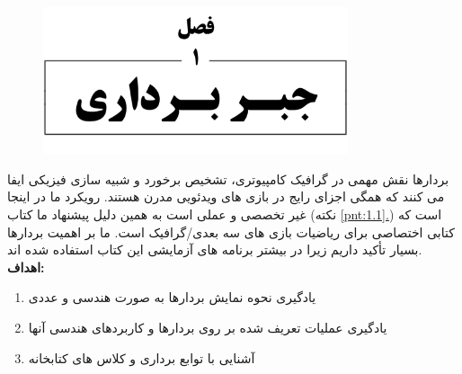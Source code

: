 \chapter{}
\textbf{\vspace{-140pt}}
\begin{figure}[H]
    \centering
    \setlength{\belowcaptionskip}{-10pt}
    \includegraphics[width=0.8\textwidth]{Images/4/1/4.Session.1.1.0}
    \label{fig:4.Session.1.2.0}
\end{figure}
\textbf{\vspace{20pt}}
{
    \Large
    \begin{spacing}{1.5}
        بردارها نقش مهمی در گرافیک کامپیوتری، تشخیص برخورد و شبیه سازی فیزیکی ایفا می کنند که همگی اجزای رایج در بازی های ویدئویی مدرن هستند.
        رویکرد ما در اینجا غیر تخصصی و عملی است به همین دلیل پیشنهاد ما کتاب  (نکته \hyperref[pnt:1.1]{\ref{pnt:1.1}.}) است که کتابی اختصاصی برای ریاضیات بازی های سه بعدی/گرافیک است.
        ما بر اهمیت بردارها بسیار تأکید داریم زیرا در بیشتر برنامه های آزمایشی این کتاب استفاده شده اند.
        \\

        \textbf{\LARGE \hspace{-40pt}اهداف:}
        \begin{enumerate}[label=\textbf{\arabic*}.]
            \item {یادگیری نحوه نمایش بردارها به صورت هندسی و عددی}
            \item {یادگیری عملیات تعریف شده بر روی بردارها و کاربردهای هندسی آنها}
            \item {آشنایی با توابع برداری و کلاس های کتابخانه }
        \end{enumerate}
    \end{spacing}
}
\newpage

\setcounter{figure}{0}
\renewcommand{\thefigure}{\arabic{figure}.\arabic{chapter}}

